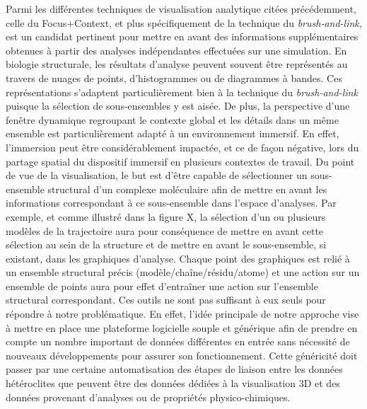 Parmi les différentes techniques de visualisation analytique citées précédemment, celle du Focus+Context, et plus spécifiquement de la technique du \textit{brush-and-link}, est un candidat pertinent pour mettre en avant des informations supplémentaires obtenues à partir des analyses indépendantes effectuées sur une simulation. En biologie structurale, les résultats d'analyse peuvent souvent être représentés au travers de nuages de points, d'histogrammes ou de diagrammes à bandes. Ces représentations s'adaptent particulièrement bien à la technique du \textit{brush-and-link} puisque la sélection de sous-ensembles y est aisée. De plus, la perspective d'une fenêtre dynamique regroupant le contexte global et les détails dans un même ensemble est particulièrement adapté à un environnement immersif. En effet, l'immersion peut être considérablement impactée, et ce de façon négative, lors du partage spatial du dispositif immersif en plusieurs contextes de travail.
Du point de vue de la visualisation, le but est d'être capable de sélectionner un sous-ensemble structural d'un complexe moléculaire afin de mettre en avant les informations correspondant à ce sous-ensemble dans l'espace d'analyses. Par exemple, et comme illustré dans la figure X, la sélection d'un ou plusieurs modèles de la trajectoire aura pour conséquence de mettre en avant cette sélection au sein de la structure et de mettre en avant le sous-ensemble, si existant, dans les graphiques d'analyse. Chaque point des graphiques est relié à un ensemble structural précis (modèle/chaîne/résidu/atome) et une action sur un ensemble de points aura pour effet d’entraîner une action sur l'ensemble structural correspondant. 
Ces outils ne sont pas suffisant à eux seuls pour répondre à notre problématique. En effet, l'idée principale de notre approche vise à mettre en place une plateforme logicielle souple et générique afin de prendre en compte un nombre important de données différentes en entrée sans nécessité de nouveaux développements pour assurer son fonctionnement. Cette généricité doit passer par une certaine automatisation des étapes de liaison entre les données hétéroclites que peuvent être des données dédiées à la visualisation 3D et des données provenant d'analyses ou de propriétés physico-chimiques.


